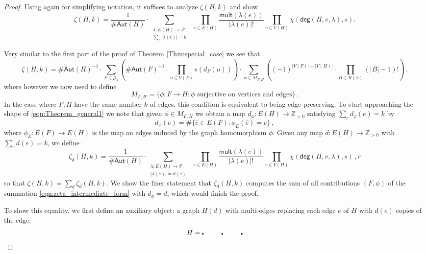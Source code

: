 \documentclass[authorcolumns,numberwithinsect]{no-lipics-v2022}
\begin{document}
\begin{proof}
Using again  for simplifying notation, it suffices to analyze $\zeta(H, k)$ and show
\[
\zeta(H,k)=\frac{1}{\#\mathsf{Aut}(H)} \cdot \sum_{\substack{\lambda: E(H) \to \mathcal{P}\\\sum_e |\lambda(e)| = k }}\ \  \prod_{e \in E(H)} \frac{\mathsf{mult}(\lambda(e))}{|\lambda(e)|!}  \prod_{v \in V(H)} \chi(\mathsf{deg}(H, v, \lambda), s).
\]

Very similar to the first part of the proof of Theorem \ref{Thm:special_case} we see that
\begin{equation} \label{eqn:zeta_intermediate_form}
\zeta(H,k) = \#\mathsf{Aut}(H)^{-1} \cdot \sum_{F \in \mathcal{G}_k} \left(\#\mathsf{Aut}(F)^{-1}\cdot  \prod_{u\in V(F)}s(d_F(u))\right)\cdot \sum_{\phi \in M_{F,H}}\left( (-1)^{|V(F)|-|V(H)|}\cdot \prod_{B \in R(\phi)} (|B|-1)!\right) \,.
\end{equation}
where however we now need to define
\[
M_{F, H} = \{\phi: F \to H : \phi \text{ surjective on vertices and edges}\}\,.
\]
In the case where $F,H$ have the same number $k$ of edges, this condition is equivalent to being edge-preserving. To start approaching the shape of \eqref{eqn:Theorem_general1} we note that given $\phi \in M_{F,H}$ we obtain a map $d_\phi: E(H) \to \mathbb{Z}_{>0}$ satisfying $\sum_e d_\phi(e) = k$ by
\begin{equation}
    d_\phi(e) = \# \{\widehat e \in E(F) : \phi_E(\widehat e) = e\}\,,
\end{equation}
where $\phi_E : E(F) \to E(H)$ is the map on edges induced by the graph homomorphism $\phi$. Given any map $d : E(H) \to \mathbb{Z}_{>0}$ with $\sum_e d(e)=k$, we define
\begin{equation} \label{eqn:zeta_d}
\zeta_d(H, k) = \frac{1}{\#\mathsf{Aut}(H)} \cdot \sum_{\substack{\lambda: E(H) \to \mathcal{P}\\|\lambda(e)| = d(e) }} \ \  \prod_{e \in E(H)} \frac{\mathsf{mult}(\lambda(e))}{|\lambda(e)|!}  \prod_{v \in V(H)} \chi(\mathsf{deg}(H, v, \lambda), s)\,,
r\end{equation}
so that $\zeta(H,k) = \sum_{d} \zeta_d(H, k)$. We show the finer statement that $\zeta_d(H, k)$ computes the sum of all contributions $(F, \phi)$ of the summation \eqref{eqn:zeta_intermediate_form} with $d_\phi = d$, which would finish the proof.

To show this equality, we first define an auxiliary object: a graph $H(d)$ with multi-edges replacing each edge $e$ of $H$ with $d(e)$ copies of the edge:
\[
H = \begin{tikzpicture}
    \draw[fill] (0,0) circle (1pt);
    \draw[fill] (1,0) circle (1pt);
    \draw[fill] (2,0) circle (1pt);


\end{tikzpicture}\]
\end{proof}
\end{document}
